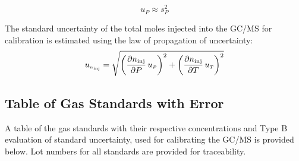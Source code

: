 \documentclass[12pt]{article}
\begin{document}
\begin{equation}
\label{eq:pressure_uncertainty}
u_{\scriptscriptstyle P} \approx  s_{\scriptscriptstyle P}^2
\end{equation}

The standard uncertainty of the total moles injected into the GC/MS for calibration is estimated using the law of propagation of uncertainty:
\begin{equation}
\label{eq:moles_injected_uncertainty}
u_{\scriptscriptstyle n_{\rm inj}} = \sqrt{{\left( \frac{\partial n_{\rm inj}}{\partial P}\,u_{\scriptscriptstyle P} \right) }^2+{\left(\frac{\partial n_{\rm inj}}{\partial T}\,u_{\scriptscriptstyle T}\right)}^2}
\end{equation}

\pagebreak
\subsection{Table of Gas Standards with Error}
\label{sssec:Table of Gas Standards with Error}
A table of the gas standards with their respective concentrations and Type B evaluation of standard uncertainty, used for calibrating the GC/MS is provided below. Lot numbers for all standards are provided for traceability.
\end{document}
